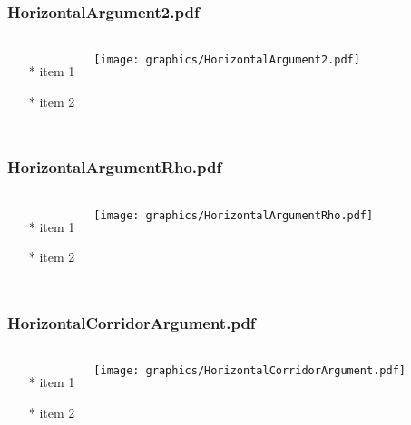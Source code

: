 \begin{frame} \frametitle{HorizontalArgument2.pdf}
    \begin{columns}[c]
        \begin{itemize}
            \item[*] item 1
            \item[*] item 2
        \end{itemize}
        \begin{minipage}{\linewidth}
            \begin{center}
            \texttt{[image: graphics/HorizontalArgument2.pdf]}
            \label{gfx:HorizontalArgument2.pdf}
            \end{center}
        \end{minipage}
    \end{columns}
\end{frame}
\begin{frame} \frametitle{HorizontalArgumentRho.pdf}
    \begin{columns}[c]
        \begin{itemize}
            \item[*] item 1
            \item[*] item 2
        \end{itemize}
        \begin{minipage}{\linewidth}
            \begin{center}
            \texttt{[image: graphics/HorizontalArgumentRho.pdf]}
            \label{gfx:HorizontalArgumentRho.pdf}
            \end{center}
        \end{minipage}
    \end{columns}
\end{frame}
\begin{frame} \frametitle{HorizontalCorridorArgument.pdf}
    \begin{columns}[c]
        \begin{itemize}
            \item[*] item 1
            \item[*] item 2
        \end{itemize}
        \begin{minipage}{\linewidth}
            \begin{center}
            \texttt{[image: graphics/HorizontalCorridorArgument.pdf]}
            \label{gfx:HorizontalCorridorArgument.pdf}
            \end{center}
        \end{minipage}
    \end{columns}
\end{frame}
